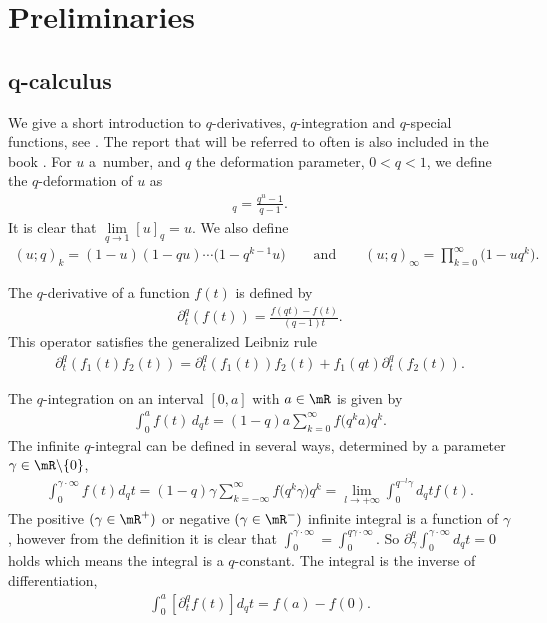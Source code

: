 \section{Preliminaries}
\subsection[$q$-calculus]{$\boldsymbol{q}$-calculus}

We give a short introduction to $q$-derivatives, $q$-integration and $q$-special functions, see \cite{MR1052153, JACKSON, Koekoek, MR1448685}. The report \cite{Koekoek} that will be referred to often is also included in the book \cite{MR2656096}. For $u$ a~number, and $q$ the deformation parameter, $0<q<1$, we def\/ine the $q$-deformation of $u$ as
\begin{gather*}
[u]_q=\frac{q^u-1}{q-1}.
\end{gather*}
It is clear that $\lim\limits_{q\to 1}[u]_q=u$. We also def\/ine
\begin{gather*}
(u;q)_k=(1-u)(1-qu)\cdots\big(1-q^{k-1}u\big)\qquad \mbox{and}\qquad (u;q)_\infty=\prod_{k=0}^\infty \big(1-uq^k\big).
\end{gather*}


The $q$-derivative of a function $f(t)$ is def\/ined by
\begin{gather}
\label{qder}
\partial^q_t (f(t)) = \frac{f(qt)-f(t)}{(q-1)t}.
\end{gather}
This operator satisf\/ies the generalized Leibniz rule
\begin{gather}
\label{Leibniz}
\partial_t^q(f_1(t)f_2(t)) = \partial_t^q(f_1(t))f_2(t)+f_1(qt)\partial_t^q(f_2(t)).
\end{gather}


The $q$-integration on an interval $[0,a]$ with $a\in \mR$ is given by
\begin{gather*}
\int_{0}^af(t)\,d_qt = (1-q)a\sum_{k=0}^\infty f\big(q^ka\big)q^k.
\end{gather*}
The inf\/inite $q$-integral can be def\/ined in several ways, determined by a parameter $\gamma\in\mR\backslash \{0\}$,
\begin{gather}
\label{gammaint}
\int_0^{\gamma\cdot\infty}f(t)d_qt = (1-q)\gamma\sum_{k=-\infty}^\infty f\big(q^k\gamma\big)q^k=\lim_{l\to+\infty}\int_0^{q^{-l}\gamma}d_qt f(t).
\end{gather}
The positive $(\gamma\in\mR^+)$ or negative $(\gamma\in\mR^-)$ inf\/inite integral is a function of $\gamma$, however from the def\/inition it is clear that $\int_0^{\gamma\cdot\infty}=\int_0^{q\gamma\cdot \infty}$. So $\partial_\gamma^q\int_0^{\gamma\cdot\infty}d_qt=0$ holds which means the integral is a $q$-constant. The integral is the inverse of dif\/ferentiation,
\begin{gather}
\label{partint1}
\int_0^{a}\left[\partial_t^qf(t)\right]d_qt = f(a)-f(0).
\end{gather}




